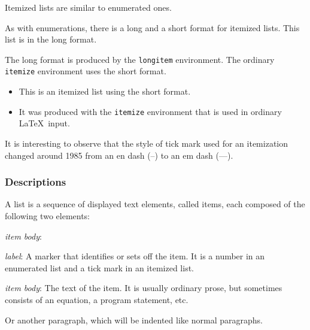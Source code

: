 \documentclass[acmtocl]{acmtrans2m}
\begin{document}
Itemized lists are similar to enumerated ones.
\begin{longitem}
\item As with enumerations, there is a long and a short
format for itemized lists.  This list is in the long format.

\item The long format is produced by the {\tt longitem}
environment.  The ordinary {\tt itemize} environment
uses the short format.
\begin{itemize}
\item This is an itemized list using the short format.

\item It was produced  with the {\tt itemize} environment
that is used in ordinary \LaTeX\ input.
\end{itemize}
\end{longitem}

It is interesting to observe that the style of tick mark used
for an itemization changed around 1985 from an en dash
(--) to an em dash (---). %

\subsubsection{Descriptions}

A list is a sequence of displayed text elements, called items, each
composed of the following two elements:
\begin{describe}{{\em item body\/}:}
\item[{\em label\/}:]
A marker that identifies or sets off the item.  It
is a number in an enumerated list and a tick mark in an itemized list.

\item[{\em item body\/}:] The text of the item.  It is usually 
ordinary prose,
but sometimes consists of an equation, a program statement, etc.

Or another paragraph, which will be indented like normal paragraphs.
\end{describe}
\end{document}
